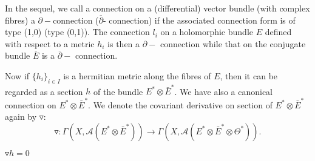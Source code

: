 In the sequel, we call a connection on a (differential) vector
bundle (with complex fibres) a $\partial -$connection (\resp  $
{\overline {\partial}} $- connection) 
if the associated connection form is of type (1,0) (\resp type (0,1)).
The connection $ {l_i}$ on a holomorphic bundle $E$ defined with respect
to a metric $ {h_i}$ is then a $\partial -$ connection while that on
the conjugate bundle $ {\overline {E}}$ is a ${\overline{\partial}-}$
connection.   

Now if $ {\{ h_i \}_{i \in I}}$ is a hermitian metric along the fibres
of $E$, then it can be regarded as a section $h$ of the bundle $E^*
\otimes {\bar{E}}^*$. We have also a canonical connection on $E^*
\otimes {\bar{E}}^*$. We denote the covariant derivative on section of
$E^* \otimes \bar{E}^*$ again by $\triangledown$: 
$$ 
 \triangledown : \Gamma (X, \mathcal{A}(E^* \otimes {\bar{E}}^*))
\rightarrow \Gamma (X, \mathcal{A}(E^* \otimes {\bar{E}}^* \otimes \Theta^* )). 
$$

\setcounter{prop}{0}
\begin{prop}\label{chap3:prop3.1}%
  ${\triangledown h = 0}$ 
\end{prop}

